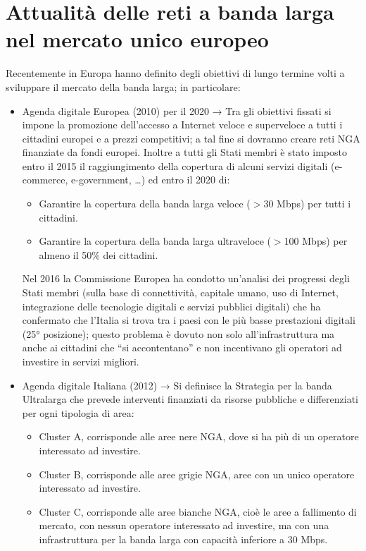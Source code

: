 \section{Attualità delle reti a banda larga nel mercato unico europeo}

Recentemente in Europa hanno definito degli obiettivi di lungo termine volti a sviluppare il mercato della
banda larga; in particolare:
\begin{itemize}
    \item Agenda digitale Europea (2010) per il 2020 → Tra gli obiettivi fissati si impone la promozione dell’accesso a Internet veloce e superveloce a tutti i cittadini europei e a prezzi competitivi; a tal fine si dovranno creare reti NGA finanziate da fondi europei. Inoltre a tutti gli Stati membri è stato imposto entro il 2015 il raggiungimento della copertura di alcuni servizi digitali (e-commerce, e-government, \dots) ed entro il 2020 di:
    \begin{itemize}
        \item Garantire la copertura della banda larga veloce ($>$30 Mbps) per tutti i cittadini.
        \item Garantire la copertura della banda larga ultraveloce ($>$100 Mbps) per almeno il 50\% dei cittadini.
    \end{itemize}
    Nel 2016 la Commissione Europea ha condotto un’analisi dei progressi degli Stati membri (sulla base di connettività, capitale umano, uso di Internet, integrazione delle tecnologie digitali e servizi pubblici digitali) che ha confermato che l’Italia si trova tra i paesi con le più basse prestazioni digitali (25° posizione); questo problema è dovuto non solo all’infrastruttura ma anche ai cittadini che “si accontentano” e non incentivano gli operatori ad investire in servizi migliori.
    \item Agenda digitale Italiana (2012) → Si definisce la Strategia per la banda Ultralarga che prevede interventi finanziati da risorse pubbliche e differenziati per ogni tipologia di area:
    \begin{itemize}
        \item Cluster A, corrisponde alle aree nere NGA, dove si ha più di un operatore interessato ad investire.
        \item Cluster B, corrisponde alle aree grigie NGA, aree con un unico operatore interessato ad investire.
        \item Cluster C, corrisponde alle aree bianche NGA, cioè le aree a fallimento di mercato, con nessun operatore interessato ad investire, ma con una infrastruttura per la banda larga con capacità inferiore a 30 Mbps.

\end{itemize}
\end{itemize}
